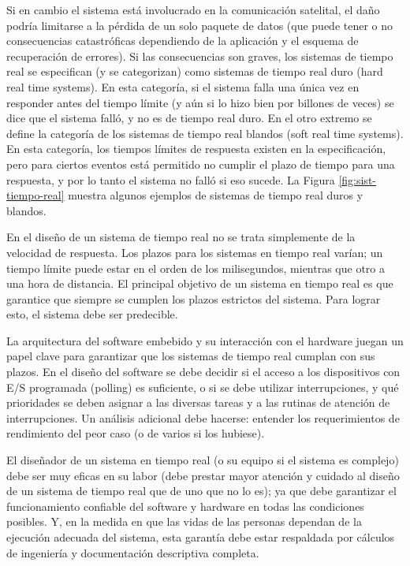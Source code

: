 \documentclass[output=paper, 
colorlinks,
citecolor=brown,
newtxmath
]{langscibook}
\begin{document}
Si en cambio el sistema está involucrado en la comunicación satelital, el daño podría 
limitarse a la pérdida de un solo paquete de datos (que puede tener o no consecuencias 
catastróficas dependiendo de la aplicación y el esquema de recuperación de errores). 
Si las consecuencias son graves, los sistemas de tiempo real se especifican (y se categorizan)
como sistemas de tiempo real duro (hard real time systems). En esta categoría, si el sistema falla una única vez
en responder antes del tiempo límite (y aún si lo hizo bien por billones de veces) se dice que el 
sistema falló, y no es de tiempo real duro.
En el otro extremo se define la categoría de los sistemas de tiempo real blandos (soft real time systems).
En esta categoría, los tiempos límites de respuesta existen en la especificación, pero para
ciertos eventos está permitido no cumplir el plazo de tiempo para una respuesta, y por lo tanto
el sistema no falló si eso sucede.
La Figura \ref{fig:sist-tiempo-real} muestra algunos ejemplos de sistemas de tiempo real duros y blandos.







En el diseño de un sistema de tiempo real no se trata simplemente de la
velocidad de respuesta. Los plazos para los sistemas en tiempo real varían; 
un tiempo límite puede estar en el orden de los milisegundos, mientras que otro 
a una hora de distancia. El principal objetivo de un sistema en tiempo real es
que garantice que siempre se cumplen los plazos estrictos del sistema. 
Para lograr esto, el sistema debe ser predecible.


La arquitectura del software embebido y su interacción con el hardware juegan 
un papel clave para garantizar que los sistemas de tiempo real cumplan con sus plazos. 
En el diseño del software se debe decidir si el acceso a los dispositivos con E/S programada
(polling) es suficiente, o si se debe utilizar interrupciones, y qué prioridades 
se deben asignar a las diversas tareas y a las rutinas de atención de interrupciones. 
Un análisis adicional debe hacerse: entender los requerimientos de rendimiento del peor caso
(o de varios si los hubiese).


El diseñador de un sistema en tiempo real (o su equipo si el sistema es complejo) debe ser
muy eficas en su labor (debe prestar mayor atención y cuidado al diseño de un sistema
de tiempo real que de uno que no lo es); 
ya que debe 
garantizar el funcionamiento confiable del software y hardware en todas 
las condiciones posibles. Y, en la medida en que las vidas de las personas dependan 
de la ejecución adecuada del sistema, esta garantía debe estar respaldada por 
cálculos de ingeniería y documentación descriptiva completa.
\end{document}

